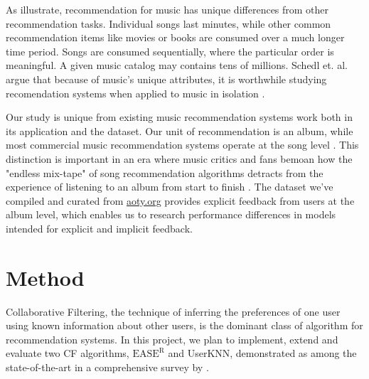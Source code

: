 \documentclass{article}
\newcommand{\easer}{$\text{EASE}^\text{R}$\xspace}
\newcommand{\userknn}{UserKNN\xspace}
\begin{document}
As \citet{Schedl2018} illustrate, recommendation for music has unique
 differences from other recommendation tasks.
Individual songs last minutes, while other common recommendation items like
 movies or books are consumed over a much longer time period.
Songs are consumed sequentially, where the particular order is meaningful.
A given music catalog may contains tens of millions.
Schedl et.
al. argue that because of music's unique attributes, it is
worthwhile
studying recomendation systems when applied to music
in isolation \citep{Schedl2018}.

Our study is unique from existing music recommendation systems work both in its
 application and the dataset.
Our unit of recommendation is an album, while most commercial music
 recommendation systems operate at the song level \citep{Schedl2018}.
This distinction is important in an era where music critics and fans bemoan how
 the "endless mix-tape" of song recommendation algorithms detracts from the
 experience of listening to an album from start to finish
 \citep{toth2018,hilton2013}.
The dataset we've compiled and curated from \url{aoty.org} provides explicit
 feedback from users at the album level, which enables us to research
 performance differences in models intended for explicit and implicit feedback.

\section{Method}
Collaborative Filtering, the technique of inferring the preferences of one user
 using known information about other users, is the dominant class of algorithm
 for recommendation systems.
In this project, we plan to implement, extend and evaluate two CF algorithms,
 \easer and \userknn, demonstrated as among the state-of-the-art in a
 comprehensive survey by \citet{anelliTopNRecommendationAlgorithms2022}.
\end{document}
